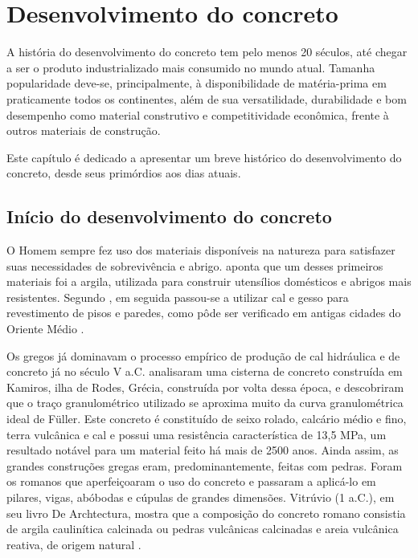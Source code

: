 \chapter{Desenvolvimento do concreto}

A história do desenvolvimento do concreto tem pelo menos 20 séculos, até chegar a ser o produto industrializado mais consumido no mundo atual. Tamanha popularidade deve-se, principalmente, à disponibilidade de matéria-prima em praticamente todos os continentes, além de sua versatilidade, durabilidade e bom desempenho como material construtivo e competitividade econômica, frente à outros materiais de construção.

Este capítulo é dedicado a apresentar um breve histórico do desenvolvimento do concreto, desde seus primórdios aos dias atuais.

\section{Início do desenvolvimento do concreto}

O Homem sempre fez uso dos materiais disponíveis na natureza para satisfazer suas necessidades de sobrevivência e abrigo.  aponta que um desses primeiros materiais foi a argila, utilizada  para construir utensílios domésticos e abrigos mais resistentes. Segundo , em seguida passou-se a utilizar cal e gesso para revestimento de pisos e paredes, como pôde ser verificado em antigas cidades do Oriente Médio \cite{Isaia}.

Os gregos já dominavam o processo empírico de produção de cal hidráulica e de concreto já no século V a.C.  analisaram uma cisterna de concreto construída em Kamiros, ilha de Rodes, Grécia, construída por volta dessa época, e descobriram que o traço granulométrico utilizado se aproxima muito da curva granulométrica ideal de Füller. Este concreto é constituído de seixo rolado, calcário médio e fino, terra vulcânica e cal e possui uma resistência característica de 13,5 MPa, um resultado notável para um material feito há mais de 2500 anos. Ainda assim, as grandes construções gregas eram, predominantemente, feitas com pedras. Foram os romanos que aperfeiçoaram o uso do concreto e passaram a aplicá-lo em pilares, vigas, abóbodas e cúpulas de grandes dimensões. Vitrúvio (1 a.C.), em seu livro De Archtectura, mostra que a composição do concreto romano consistia de argila caulinítica calcinada ou pedras vulcânicas calcinadas e areia vulcânica reativa, de origem natural \cite{Isaia}.

